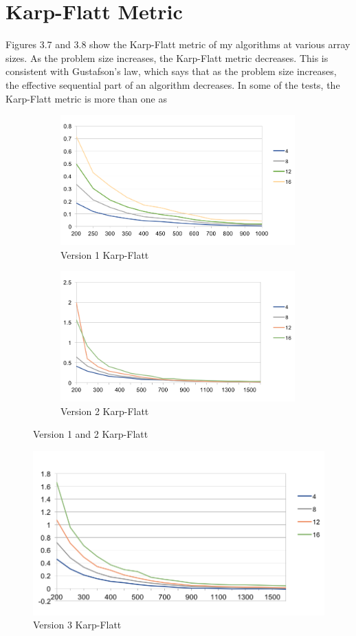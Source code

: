\documentclass{report}
\begin{document}
\section{Karp-Flatt Metric}
Figures 3.7 and 3.8 show the Karp-Flatt metric of my algorithms at various array sizes. As the problem size increases, the Karp-Flatt metric decreases. This is consistent with Gustafson's law, which says that as the problem size increases, the effective sequential part of an algorithm decreases. In some of the tests, the Karp-Flatt metric is more than one as 
\begin{figure}[h]
\begin{subfigure}{0.5\textwidth}
\includegraphics[width=1\linewidth, height=5cm]{V1-Karp-Flatt} 
\caption{Version 1 Karp-Flatt}
\label{fig:subim4}
\end{subfigure}
\begin{subfigure}{0.5\textwidth}
\includegraphics[width=1\linewidth, height=5cm]{V2-Karp-Flatt} 
\caption{Version 2 Karp-Flatt}
\label{fig:subim5}
\end{subfigure}
\caption{Version 1 and 2 Karp-Flatt}
\end{figure}
\begin{figure}[h]
\includegraphics[width=1\textwidth]{V3-Karp-Flatt}
\caption{Version 3 Karp-Flatt}
\label{fig:subim6}
\end{figure}
\end{document}
